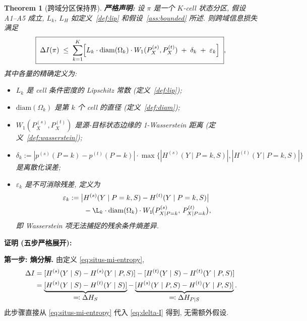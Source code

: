 \documentclass[12pt,a4paper]{article}
\newtheorem{theorem}{Theorem}[section]
\newcommand{\Wass}{W_1}
\newcommand{\diam}{\mathrm{diam}}
\begin{document}
\begin{theorem}[跨域分区保持界]\label{thm:main-bound}
\textbf{严格声明:}
设 $\pi$ 是一个 $K$-cell 状态分区, 假设 A1--A5 成立,
$L_k$, $L_H$ 如定义~\ref{def:lip} 和假设~\ref{ass:bounded} 所述.
则跨域信息损失满足
\begin{equation}\label{eq:main-ineq}
    \boxed{\;
    \Delta I(\pi) \;\leq\;
    \sum_{k=1}^{K}
    \Bigl[
        L_k \cdot \diam(\Omega_k) \cdot \Wass(P^{(s)}_X, P^{(t)}_X)
        \;+\; \delta_k
        \;+\; \varepsilon_k
    \Bigr]
    \;},
\end{equation}
其中各量的精确定义为:
\begin{itemize}[nosep]
    \item $L_k$ 是 cell 条件密度的 Lipschitz 常数 (定义~\ref{def:lip});
    \item $\diam(\Omega_k)$ 是第 $k$ 个 cell 的直径 (定义~\ref{def:diam});
    \item $\Wass(P^{(s)}_X,P^{(t)}_X)$ 是源-目标状态边缘的
          1-Wasserstein 距离 (定义~\ref{def:wasserstein});
    \item $\delta_k := |p^{(s)}(P=k)-p^{(t)}(P=k)|\cdot
          \max\{|H^{(s)}(Y\mid P=k,S)|,|H^{(t)}(Y\mid P=k,S)|\}$
          是离散化误差;
    \item $\varepsilon_k$ 是不可消除残差, 定义为
          \begin{align*}
          \varepsilon_k &:= \bigl|H^{(s)}(Y\mid P=k,S)
          -H^{(t)}(Y\mid P=k,S)\bigr| \\
          &\qquad - \L_k\cdot\diam(\Omega_k)\cdot
          \Wass\!\bigl(P^{(s)}_{X\mid P=k},\,P^{(t)}_{X\mid P=k}\bigr),
          \end{align*}
          即 Wasserstein 项无法捕捉的残余条件熵差异.
\end{itemize}
\end{theorem}

\medskip\noindent
\textbf{证明 (五步严格展开):}

\medskip\noindent
\textbf{第一步: 熵分解.}
由定义 \eqref{eq:situs-mi-entropy},
\begin{align}
    \Delta I &= [H^{(s)}(Y\mid S) - H^{(s)}(Y\mid P,S)]
               - [H^{(t)}(Y\mid S) - H^{(t)}(Y\mid P,S)] \notag\\
             &= \underbrace{[H^{(s)}(Y\mid S) - H^{(t)}(Y\mid S)]}_{\displaystyle
                \eqqcolon \Delta H_S}
                - \underbrace{[H^{(s)}(Y\mid P,S) -
                  H^{(t)}(Y\mid P,S)]}_{\displaystyle
                  \eqqcolon \Delta H_{P\mid S}}.
                \label{eq:decomp-step1}
\end{align}
此步骤直接从 \eqref{eq:situs-mi-entropy} 代入
\eqref{eq:delta-I} 得到, 无需额外假设. \checkmark
\end{document}
